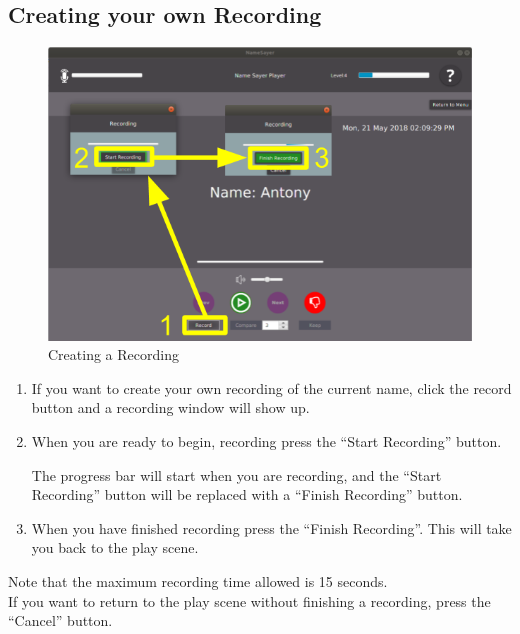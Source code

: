 \documentclass[a4paper,12pt]{article}
\begin{document}
\subsection{Creating your own Recording}
\begin{figure}[!h]
	\includegraphics[width=\linewidth]{record.png}
	\caption{Creating a Recording}
\end{figure}
\begin{enumerate}[label=\textbf{\arabic*}]
	\item If you want to create your own recording of the current name, click the record button and a recording window will show up.
	
	\item When you are ready to begin, recording press the “Start Recording” button.
	
	
	
	The progress bar will start when you are recording, and the “Start Recording” button will be replaced with a “Finish Recording” button.
	
	\item When you have finished recording press the “Finish Recording”. This will take you back to the play scene.
	
\end{enumerate}
Note that the maximum recording time allowed is 15 seconds.
\\


If you want to return to the play scene without finishing a recording, press the “Cancel” button.

\newpage
\end{document}
